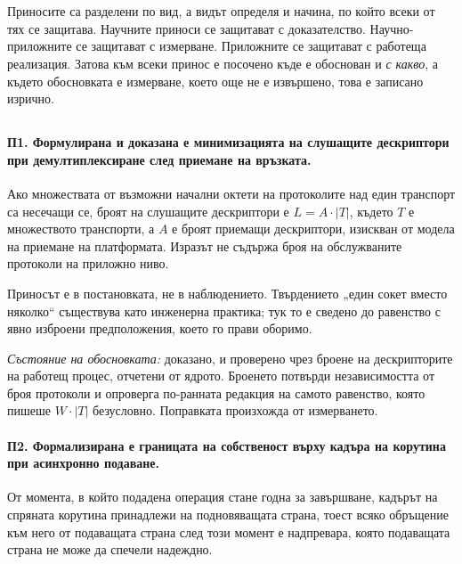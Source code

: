 %

\section*{}

Приносите са разделени по вид, а видът определя и начина, по който всеки от тях се защитава.
Научните приноси се защитават с доказателство. Научно-приложните се защитават с измерване.
Приложните се защитават с работеща реализация. Затова към всеки принос е посочено къде е
обоснован и \emph{с какво}, а където обосновката е измерване, което още не е извършено, това
е записано изрично.

\subsection*{}

\paragraph{П1. Формулирана и доказана е минимизацията на слушащите дескриптори при
демултиплексиране след приемане на връзката.}
Ако множествата от възможни начални октети на протоколите над един транспорт са несечащи се,
броят на слушащите дескриптори е \(L = A \cdot |T|\), където \(T\) е множеството транспорти,
а \(A\) е броят приемащи дескриптори, изискван от модела на приемане на платформата. Изразът
не съдържа броя на обслужваните протоколи на приложно ниво.

Приносът е в постановката, не в наблюдението. Твърдението „един сокет вместо няколко“
съществува като инженерна практика; тук то е сведено до равенство с явно изброени
предположения, което го прави оборимо.

\emph{Състояние на обосновката:} доказано, и проверено чрез броене на дескрипторите на
работещ процес, отчетени от ядрото. Броенето потвърди независимостта от броя протоколи и
опроверга по-ранната редакция на самото равенство, която пишеше \(W \cdot |T|\) безусловно.
Поправката произхожда от измерването.

\paragraph{П2. Формализирана е границата на собственост върху кадъра на корутина при
асинхронно подаване.}
От момента, в който подадена операция стане годна за завършване, кадърът на спряната корутина
принадлежи на подновяващата страна, тоест всяко обръщение към него от подаващата страна след
този момент е надпревара, която подаващата страна не може да спечели надеждно.

